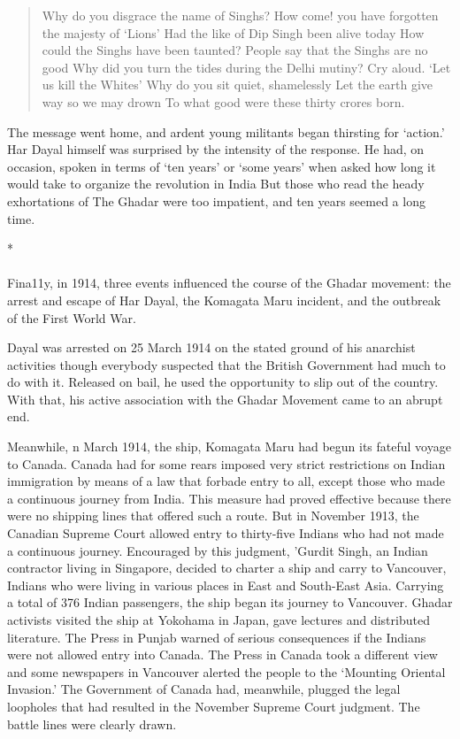 \begin{verse}
	Why do you disgrace the name of Singhs?
	How come! you have forgotten the majesty of `Lions'
	Had the like of Dip Singh been alive today
	How could the Singhs have been taunted?
	People say that the Singhs are no good
	Why did you turn the tides during the Delhi mutiny?
	Cry aloud. `Let us kill the Whites'
	Why do you sit quiet, shamelessly
	Let the earth give way so we may drown
	To what good were these thirty crores born.
\end{verse}

The message went home, and ardent young militants began thirsting for `action.' Har Dayal himself was surprised by the intensity of the response. He had, on occasion, spoken in terms of `ten years' or `some years' when asked how long it would take to organize the revolution in India But those who read the heady exhortations of The Ghadar were too impatient, and ten years seemed a long time.

\begin{center}*\end{center}

\paragraph*{}

Fina11y, in 1914, three events influenced the course of the Ghadar movement: the arrest and escape of Har Dayal, the Komagata Maru incident, and the outbreak of the First World War.

Dayal was arrested on 25 March 1914 on the stated ground of his anarchist activities though everybody suspected that the British Government had much to do with it. Released on bail, he used the opportunity to slip out of the country. With that, his active association with the Ghadar Movement came to an abrupt end.

Meanwhile, n March 1914, the ship, Komagata Maru had begun its fateful voyage to Canada. Canada had for some rears imposed very strict restrictions on Indian immigration by means of a law that forbade entry to all, except those who made a continuous journey from India. This measure had proved effective because there were no shipping lines that offered such a route. But in November 1913, the Canadian Supreme Court allowed entry to thirty-five Indians who had not made a continuous journey. Encouraged by this judgment, 'Gurdit Singh, an Indian contractor living in Singapore, decided to charter a ship and carry to Vancouver, Indians who were living in various places in East and South-East Asia. Carrying a total of 376 Indian passengers, the ship began its journey to Vancouver. Ghadar activists visited the ship at Yokohama in Japan, gave lectures and distributed literature. The Press in Punjab warned of serious consequences if the Indians were not allowed entry into Canada. The Press in Canada took a different view and some newspapers in Vancouver alerted the people to the `Mounting Oriental Invasion.' The Government of Canada had, meanwhile, plugged the legal loopholes that had resulted in the November Supreme Court judgment. The battle lines were clearly drawn.

